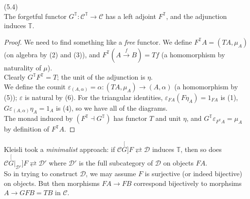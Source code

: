 \documentclass[a4paper]{article}
\begin{document}
\begin{lemma} (5.4)\\
    The forgetful functor $G^{\mathbb{T}}: \mathcal{C}^\mathbb{T} \to \mathcal{C}$ has a left adjoint $F^\mathbb{T}$, and the adjunction induces $\mathbb{T}$.
    \begin{proof}
        We need to find something like a \emph{free} functor. We define $F^\mathbb{T} A = (TA,\mu_A)$ (on algebra by (2) and (3)), and $F^\mathbb{T}(A\xrightarrow{f} B) = Tf$ (a homomorphism by naturality of $\mu$).\\
        Clearly $G^\mathbb{T} F^\mathbb{T} = T$; the unit of the adjunction is $\eta$.\\
        We define the counit $\varepsilon_{(A,\alpha)}= \alpha:(TA,\mu_A) \to (A,\alpha)$ (a homomorphism by (5)); $\varepsilon$ is natural by (6). For the triangular identities, $\varepsilon_{FA}(F\eta_A) = 1_{FA}$ is (1), $G\varepsilon_{(A,\alpha)} \eta_A = 1_A$ is (4), so we have all of the diagrams.\\
        The monad induced by $(F^\mathbb{T} \dashv G^\mathbb{T})$ has functor $T$ and unit $\eta$, and $G^\mathbb{T} \varepsilon_{F^\mathbb{T} A} = \mu_A$ by definition of $F^\mathbb{T} A$.
    \end{proof}

    Kleisli took a \emph{minimalist} approach: if $\mathcal{C} \stackrel[G]{F}{\rightleftarrows} \mathcal{D}$ induces $\mathbb{T}$, then so does $\mathcal{C} \stackrel[G|_{\mathcal{D}'}]{F}{\rightleftarrows} \mathcal{D}'$ where $\mathcal{D}'$ is the full subcategory of $\mathcal{D}$ on objects $FA$.\\
    So in trying to construct $\mathcal{D}$, we may assume $F$ is surjective (or indeed bijective) on objects. But then morphisms $FA \to FB$ correspond bijectively to morphsims $A \to GFB = TB$ in $\mathcal{C}$.
\end{lemma}
\end{document}
